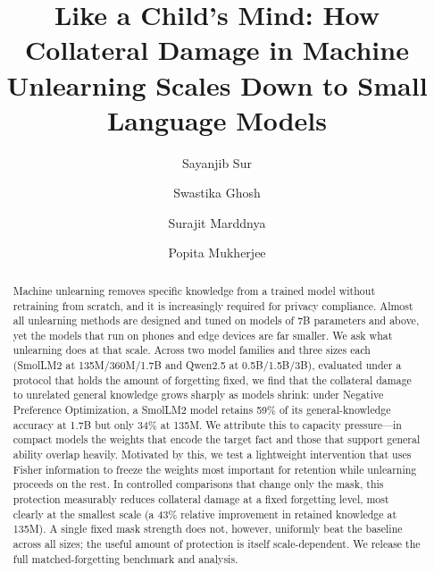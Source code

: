 \documentclass[sigconf,nonacm]{acmart}
\begin{document}
\title{Like a Child's Mind: How Collateral Damage in Machine Unlearning Scales Down to Small Language Models}

\author{Sayanjib Sur}
\email{}
\author{Swastika Ghosh}
\email{}
\author{Surajit Marddnya}
\email{}
\author{Popita Mukherjee}
\email{}

\renewcommand{\shortauthors}{Sur et al.}

\begin{abstract}
Machine unlearning removes specific knowledge from a trained model without retraining from scratch, and it is increasingly required for privacy compliance. Almost all unlearning methods are designed and tuned on models of 7B parameters and above, yet the models that run on phones and edge devices are far smaller. We ask what unlearning does at that scale. Across two model families and three sizes each (SmolLM2 at 135M/360M/1.7B and Qwen2.5 at 0.5B/1.5B/3B), evaluated under a protocol that holds the amount of forgetting fixed, we find that the collateral damage to unrelated general knowledge grows sharply as models shrink: under Negative Preference Optimization, a SmolLM2 model retains 59\% of its general-knowledge accuracy at 1.7B but only 34\% at 135M. We attribute this to capacity pressure---in compact models the weights that encode the target fact and those that support general ability overlap heavily. Motivated by this, we test a lightweight intervention that uses Fisher information to freeze the weights most important for retention while unlearning proceeds on the rest. In controlled comparisons that change only the mask, this protection measurably reduces collateral damage at a fixed forgetting level, most clearly at the smallest scale (a 43\% relative improvement in retained knowledge at 135M). A single fixed mask strength does not, however, uniformly beat the baseline across all sizes; the useful amount of protection is itself scale-dependent. We release the full matched-forgetting benchmark and analysis.
\end{abstract}
\end{document}

